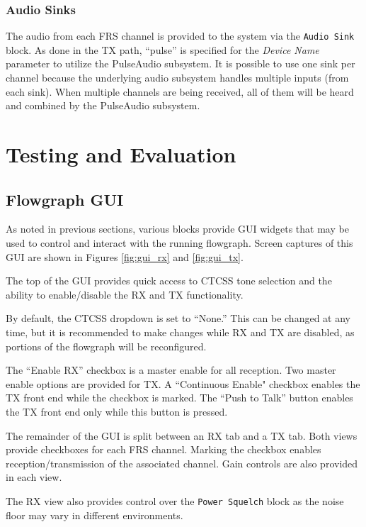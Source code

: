\subsubsection{Audio Sinks}
The audio from each \ac{FRS} channel is provided to
the system via the \texttt{Audio Sink} block. As done in the \ac{TX} path,
``pulse'' is specified for the \textit{Device Name} parameter to utilize the
PulseAudio subsystem. It is possible to use one sink per channel because the
underlying audio subsystem handles multiple inputs (from each sink). When
multiple channels are being received, all of them will be heard and combined
by the PulseAudio subsystem.

\cleardoublepage

\section{Testing and Evaluation} \label{sec:testing}

\subsection{Flowgraph GUI}
As noted in previous sections, various blocks provide \ac{GUI} widgets that may
be used to control and interact with the running flowgraph. Screen captures of
this \ac{GUI} are shown in Figures \ref{fig:gui_rx} and \ref{fig:gui_tx}.

The top of the \ac{GUI} provides quick access to \ac{CTCSS} tone selection and
the ability to enable/disable the \ac{RX} and \ac{TX} functionality.

By default, the \ac{CTCSS} dropdown is set to ``None.'' This can be changed at
any time, but it is recommended to make changes while \ac{RX} and \ac{TX} are
disabled, as portions of the flowgraph will be reconfigured.

The ``Enable RX'' checkbox is a master enable for all reception. Two master
enable options are provided for \ac{TX}. A ``Continuous Enable" checkbox enables
the \ac{TX} front end while the checkbox is marked. The ``Push to Talk'' button
enables the \ac{TX} front end only while this button is pressed.

The remainder of the \ac{GUI} is split between an \ac{RX} tab and a \ac{TX}
tab. Both views provide checkboxes for each \ac{FRS} channel. Marking the
checkbox enables reception/transmission of the associated channel. Gain controls
are also provided in each view.

The \ac{RX} view also provides control over the \texttt{Power Squelch} block
as the noise floor may vary in different environments.

